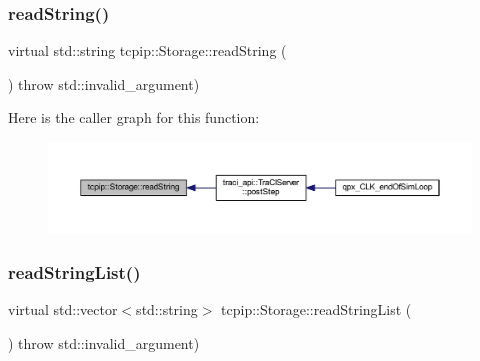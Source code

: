 \mbox{\label{classtcpip_1_1_storage_afe367b1d224d73ab06d0ab7899bcd097}} 
\subsubsection{\texorpdfstring{read\+String()}{readString()}}
{\footnotesize\ttfamily virtual std\+::string tcpip\+::\+Storage\+::read\+String (\begin{DoxyParamCaption}{ }\end{DoxyParamCaption}) throw  std\+::invalid\+\_\+argument) \hspace{0.3cm}{\ttfamily [virtual]}}

Here is the caller graph for this function\+:\nopagebreak
\begin{figure}[H]
\begin{center}
\leavevmode
\includegraphics[width=350pt]{classtcpip_1_1_storage_afe367b1d224d73ab06d0ab7899bcd097_icgraph}
\end{center}
\end{figure}
\mbox{\label{classtcpip_1_1_storage_afc0459cbb0bf405c5d3d1730c5a98b35}} 
\subsubsection{\texorpdfstring{read\+String\+List()}{readStringList()}}
{\footnotesize\ttfamily virtual std\+::vector$<$std\+::string$>$ tcpip\+::\+Storage\+::read\+String\+List (\begin{DoxyParamCaption}{ }\end{DoxyParamCaption}) throw  std\+::invalid\+\_\+argument) \hspace{0.3cm}{\ttfamily [virtual]}}

\mbox{\label{classtcpip_1_1_storage_a46215cfa07dcabbdea932e4c69504019}} 
